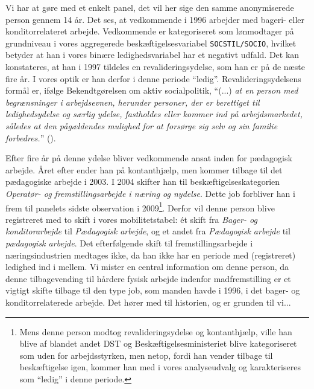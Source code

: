 %
Vi har at gøre med et enkelt panel, det vil her sige den samme anonymiserede person gennem 14 år. Det ses, at vedkommende i 1996 arbejder med bageri- eller konditorrelateret arbejde. Vedkommende er kategoriseret som lønmodtager på grundniveau i vores aggregerede beskæftigelsesvariabel \texttt{SOCSTIL/SOCIO}, hvilket betyder at han i vores binære ledighedsvariabel har et negativt udfald. Det kan konstateres, at han i 1997 tildeles en revalideringsydelse, som han er på de næste fire år. I vores optik er han derfor i denne periode “ledig”. Revalideringsydelsens formål er, ifølge Bekendtgørelsen om aktiv socialpolitik, “(...) \emph{at en person med begrænsninger i arbejdsevnen, herunder personer, der er berettiget til ledighedsydelse og særlig ydelse, fastholdes eller kommer ind på arbejdsmarkedet, således at den pågældendes mulighed for at forsørge sig selv og sin familie forbedres.}” (\textcite{lov_revalidering}).

Efter fire år på denne ydelse bliver vedkommende ansat inden for pædagogisk arbejde.  Året efter ender han på kontanthjælp, men kommer tilbage til det pædagogiske arbejde i 2003. I 2004 skifter han til beskæftigelseskategorien \emph{Operatør- og fremstillingsarbejde i næring og nydelse}. Dette job forbliver han i frem til panelets sidste observation i 2009\footnote{Mens denne person modtog revalideringsydelse og kontanthjælp, ville han blive af blandet andet DST og Beskæftigelsesministeriet blive kategoriseret som uden for arbejdsstyrken, men netop, fordi han vender tilbage til beskæftigelse igen, kommer han med i vores analyseudvalg og karakteriseres som “ledig” i denne periode.}. Derfor vil denne person blive registreret med to skift i vores mobilitetstabel: ét skift fra \emph{Bager- og konditorarbejde} til \emph{Pædagogisk arbejde}, og et andet fra \emph{Pædagogisk arbejde} til \emph{pædagogisk arbejde}. Det efterfølgende skift til fremstillingsarbejde i næringsindustrien medtages ikke, da han ikke har en periode med (registreret) ledighed ind i mellem. Vi mister en central information om denne person, da denne tilbagevending til hårdere fysisk arbejde indenfor madfremstilling er et vigtigt skifte tilbage til den type job, som manden havde i 1996, i det bager- og konditorrelaterede arbejde. Det hører med til historien, og er grunden til vi... %

